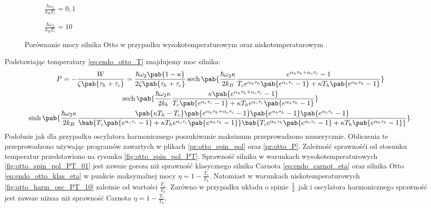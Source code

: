 \begin{figure}[tp]
	\centering
	\begin{subfigure}{0.45\textwidth}
		\centering
		
		\caption{\(\frac{\hbar\omega_2}{k_B T_c} = 0,1\)}
		\label{fig:otto_harm_osc_Peta_01}
	\end{subfigure}
	\begin{subfigure}{0.45\textwidth}
		\centering
		
		\caption{\(\frac{\hbar\omega_2}{k_B T_c} = 10\)}
		\label{fig:otto_harm_osc_Peta_10}
	\end{subfigure}
	\captionsetup{subrefformat=parens}
	\caption{Porównanie mocy silnika Otto w przypadku wysokotemperaturowym  oraz niskotemperaturowym .}
	\label{fig:otto_harm_osc_Peta}
\end{figure}

Podstawiając temperatury \eqref{eq:endo_otto_T} znajdujemy moc silnika:
\begin{multline}
	P = - \frac{W}{\zeta\pab{\tau_h + \tau_c}} =
	\frac{\hbar\omega_2 \pab{1-\kappa}}{2\zeta\pab{\tau_h + \tau_c}}
	\sech\pab{\frac{\hbar\omega_2 \kappa}{2k_B}
		\frac{
			e^{\alpha_h \tau_h + \alpha_c \tau_c} - 1
		}{
			T_c e^{\alpha_h \tau_h} \pab{e^{\alpha_c \tau_c} - 1} + \kappa T_h \pab{e^{\alpha_h \tau_h} - 1}
	}} \\
	\sech\pab{\frac{\hbar\omega_2 \kappa}{2k_b}
		\frac{
			\kappa \pab{e^{\alpha_h \tau_h + \alpha_c \tau_c} - 1}
		}{
			T_c \pab{e^{\alpha_c \tau_c} - 1} + \kappa T_h e^{\alpha_c \tau_c} \pab{e^{\alpha_h \tau_h} - 1}
	}} \\
	\sinh\pab{\frac{\hbar\omega_2 \kappa}{2k_B}
		\frac{
			\pab{\kappa T_h - T_c}\pab{e^{\alpha_h \tau_h + \alpha_c \tau_c} - 1}\pab{e^{\alpha_h \tau_h} - 1}\pab{e^{\alpha_c \tau_c} - 1}
		}{
			\bab{T_c \pab{e^{\alpha_c \tau_c} - 1} + \kappa T_h e^{\alpha_c \tau_c} \pab{e^{\alpha_h \tau_h} - 1}}
			\bab{T_c e^{\alpha_h \tau_h} \pab{e^{\alpha_c \tau_c} - 1} + \kappa T_h \pab{e^{\alpha_h \tau_h} - 1}}
	}}.
\end{multline}
Podobnie jak dla przypadku oscylatora harmonicznego poszukiwanie maksimum przeprowadzono numerycznie. Obliczenia te przeprowadzono używając programów zawartych w plikach \ref{pr:otto_spin_pol} oraz \ref{pr:otto_P}. Zależność sprawnośći od stosunku temperatur przedstawiono na rysunku \ref{fig:otto_spin_pol_PT}. Sprawność silnika w warunkach wysokotemperaturowych \ref{fig:otto_spin_pol_PT_01} jest zawsze gorsza niż sprawność klasycznego silnika Carnota \eqref{eq:endo_carnot_eta} oraz silnika Otto \eqref{eq:endo_otto_klas_eta} w punkcie maksymalnej mocy \(\eta = 1 - \frac{T_c}{T_h}\). Natomiast w warunkach niskotemperaturowych \ref{fig:otto_harm_osc_PT_10} zależnie od wartości \(\frac{T_c}{T_h}\). Zarówno w przypadku układu o spinie \(\frac{1}{2}\) jak i oscylatora harmonicznego sprawność jest zawsze niższa niż sprawność Carnota \(\eta = 1 - \frac{T_c}{T_h}\).
